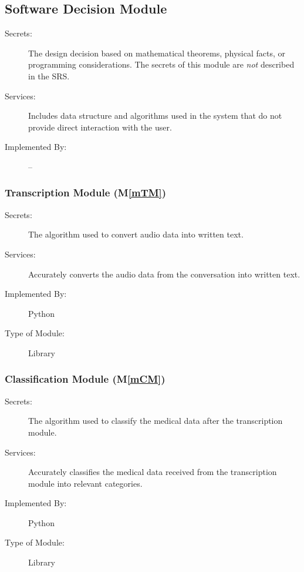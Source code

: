 \documentclass[12pt, titlepage]{article}
\newcommand{\mref}[1]{M\ref{#1}}
\begin{document}
\subsection{Software Decision Module}

\begin{description}
\item[Secrets:]The design decision based on mathematical theorems, physical facts, or programming considerations. The secrets of this module are
  \emph{not} described in the SRS.
\item[Services:]Includes data structure and algorithms used in the system that do not provide direct interaction with the user. 
\item[Implemented By:] --
\end{description}


\subsubsection{Transcription Module (\mref{mTM})}

\begin{description}
\item[Secrets:]The algorithm used to convert audio data into written text.
\item[Services:]Accurately converts the audio data from the conversation into written text.   
\item[Implemented By:]Python
\item[Type of Module:]Library
\end{description}

\subsubsection{Classification Module (\mref{mCM})}

\begin{description}
\item[Secrets:]The algorithm used to classify the medical data after the transcription module.
\item[Services:]Accurately classifies the medical data received from the transcription module into relevant categories.
\item[Implemented By:]Python
\item[Type of Module:]Library
\end{description}
\end{document}
